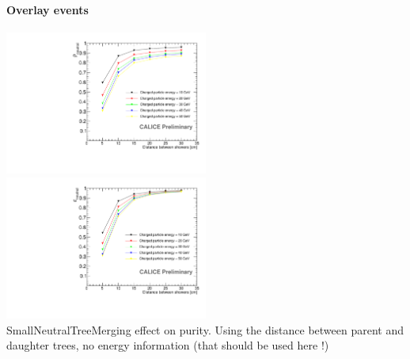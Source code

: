 \documentclass[8pt]{beamer}
\begin{document}
  
  \begin{frame}
  \frametitle{\secname}
  \framesubtitle{Overlay events}
    \begin{center}
      \includegraphics[width=0.5\textwidth]{plots/OverlayEvent_NeutralPurity.pdf}
      \includegraphics[width=0.5\textwidth]{plots/OverlayEvent_NeutralEfficiency.pdf} \\
      SmallNeutralTreeMerging effect on purity. Using the distance between parent and daughter trees, no energy information (that should be used here !)
    \end{center}
  \end{frame}
  
\end{document}
